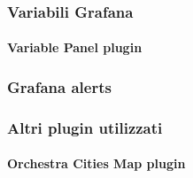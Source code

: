 \subsubsection{Variabili Grafana}
\paragraph{Variable Panel plugin}




\subsubsection{Grafana alerts}


\subsubsection{Altri plugin utilizzati}
\paragraph{Orchestra Cities Map plugin}
